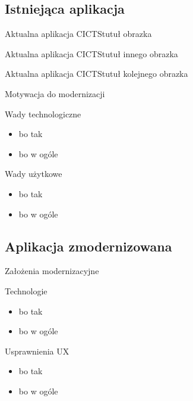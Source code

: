 \subsection{Istniejąca aplikacja}

\begin{frame}{Aktualna aplikacja CICTS}{tutuł obrazka}
\end{frame}

\begin{frame}{Aktualna aplikacja CICTS}{tutuł innego obrazka}
\end{frame}

\begin{frame}{Aktualna aplikacja CICTS}{tutuł kolejnego obrazka}
\end{frame}

\begin{frame}{Motywacja do modernizacji}
    \begin{block}{Wady technologiczne}
        \begin{itemize}
        \item bo tak
        \item bo w ogóle
        \end{itemize}
    \end{block}

    \begin{block}{Wady użytkowe}
        \begin{itemize}
        \item bo tak
        \item bo w ogóle
        \end{itemize}
    \end{block}
\end{frame}

\subsection{Aplikacja zmodernizowana}

\begin{frame}{Założenia modernizacyjne}
    \begin{block}{Technologie}
        \begin{itemize}
        \item bo tak
        \item bo w ogóle
        \end{itemize}
    \end{block}

    \begin{block}{Usprawnienia UX}
        \begin{itemize}
        \item bo tak
        \item bo w ogóle
        \end{itemize}
    \end{block}
\end{frame}

